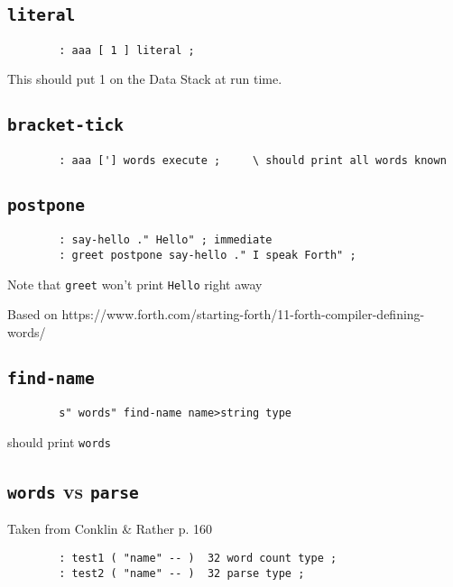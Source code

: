 \subsection{\texttt{literal}}

\begin{lstlisting}
        : aaa [ 1 ] literal ;
\end{lstlisting}

\noindent This should put 1 on the Data Stack at run time.


\subsection{\texttt{bracket-tick}}

\begin{lstlisting}
        : aaa ['] words execute ;     \ should print all words known
\end{lstlisting}


\subsection{\texttt{postpone}}

\begin{lstlisting}
        : say-hello ." Hello" ; immediate
        : greet postpone say-hello ." I speak Forth" ;
\end{lstlisting}

\noindent Note that \texttt{greet} won't print \texttt{Hello} right away

\noindent Based on https://www.forth.com/starting-forth/11-forth-compiler-defining-words/


\subsection{\texttt{find-name}}

\begin{lstlisting}
        s" words" find-name name>string type
\end{lstlisting}

\noindent should print \texttt{words}


\subsection{\texttt{words} vs \texttt{parse}}

Taken from Conklin \& Rather p. 160

\begin{lstlisting}
        : test1 ( "name" -- )  32 word count type ; 
        : test2 ( "name" -- )  32 parse type ; 
\end{lstlisting}


